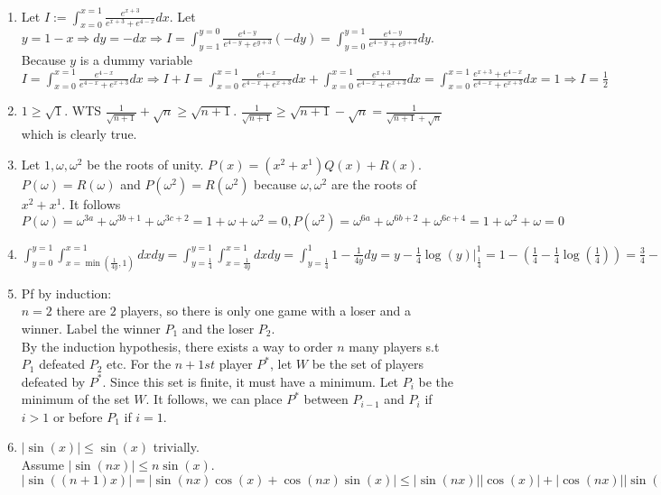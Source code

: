 \documentclass[10pt]{article}
\begin{document}
\begin{enumerate}[label= (Q-\arabic*)]
    $f(0)=f(n\cdot 0)=\sqrt{n{f(0)}^2}=\sqrt{n}|f(0)|\Rightarrow f(0)=0$ or $\sqrt{n}=\pm 1$. 
    $\sqrt{n}\neq\pm1$ unless $n=1$. Thus, $f(0)=0$. $f(0)=f(x+(-x))=\sqrt{{f(x)}^2+{f(-x)}^2}=0\Rightarrow {f(x)}^2=-{f(-x)}^2$ which can only be true if $f(x)=0$ because $f(x)\in \mathbb{R}$.
    \item Let $I:=\int_{x=0}^{x=1}\frac{e^{x+3}}{e^{x+3}+e^{4-x}}dx$. Let $y=1-x\Rightarrow dy=-dx\Rightarrow I=\int_{y=1}^{y=0}\frac{e^{4-y}}{e^{4-y}+e^{y+3}}(-dy)=\int_{y=0}^{y=1}\frac{e^{4-y}}{e^{4-y}+e^{y+3}}dy$. Because $y$ is a dummy variable $I=\int_{x=0}^{x=1}\frac{e^{4-x}}{e^{4-x}+e^{x+3}}dx\Rightarrow I+I=\int_{x=0}^{x=1}\frac{e^{4-x}}{e^{4-x}+e^{x+3}}dx+\int_{x=0}^{x=1}\frac{e^{x+3}}{e^{4-x}+e^{x+3}}dx=\int_{x=0}^{x=1}\frac{e^{x+3}+e^{4-x}}{e^{4-x}+e^{x+3}}dx=1\Rightarrow I=\frac{1}{2}$
    \item $1\ge\sqrt{1}$. WTS $\frac{1}{\sqrt{n+1}}+\sqrt{n}\ge \sqrt{n+1}$. $\frac{1}{\sqrt{n+1}}\ge \sqrt{n+1}-\sqrt{n}=\frac{1}{\sqrt{n+1}+\sqrt{n}}$ which is clearly true.
    \item Let $1,\omega,\omega^2$ be the roots of unity. $P(x)=(x^2+x^1)Q(x)+R(x)$. $P(\omega)=R(\omega)$ and $P(\omega^2)=R(\omega^2)$ because $\omega,\omega^2$ are the roots of $x^2+x^1$. It follows $P(\omega)=\omega^{3a}+\omega^{3b+1}+\omega^{3c+2}=1+\omega+\omega^2=0,P(\omega^2)=\omega^{6a}+\omega^{6b+2}+\omega^{6c+4}=1+\omega^2+\omega=0$
    \item $\int_{y=0}^{y=1}\int_{x=\min(\frac{1}{4y},1)}^{x=1}dxdy=\int_{y=\frac{1}{4}}^{y=1}\int_{x=\frac{1}{4y}}^{x=1}dxdy=\int_{y=\frac{1}{4}}^{1}1-\frac{1}{4y}dy=y-\frac{1}{4}\log(y)|_\frac{1}{4}^1=1-(\frac{1}{4}-\frac{1}{4}\log(\frac{1}{4}))=\frac{3}{4}-\frac{1}{2}\log(2)$
    \item Pf by induction:\\
    $n=2$ there are $2$ players, so there is only one game with a loser and a winner. Label the winner $P_1$ and the loser $P_2$.\\
    By the induction hypothesis, there exists a way to order $n$ many players s.t $P_1$ defeated $P_2$ etc. 
    For the $n+1st$ player $P^*$, let $W$ be the set of players defeated by $P^*$. Since this set is finite, it must have a minimum. Let $P_i$ be the minimum of the set $W$.
    It follows, we can place $P^*$ between $P_{i-1}$ and $P_i$ if $i>1$ or before $P_1$ if $i=1$.
    \item $|\sin(x)|\le \sin(x)$ trivially.\\
    Assume $|\sin(nx)|\le n\sin(x)$. $|\sin((n+1)x)|=|\sin(nx)\cos(x)+\cos(nx)\sin(x)|\le|\sin(nx)||\cos(x)|+|\cos(nx)||\sin(x)|\le|\sin(nx)|+|\sin(x)|\le n\sin(x)+\sin(x)=(n+1)\sin(x)$

\end{enumerate}
\end{document}
